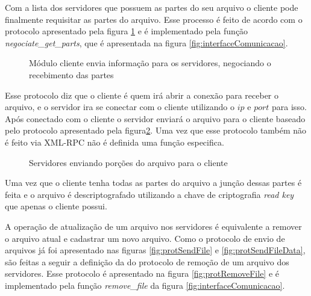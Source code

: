         Com a lista dos servidores que possuem as partes do seu arquivo o cliente pode finalmente requisitar as partes do arquivo. Esse processo é feito de acordo com o protocolo apresentado pela figura \ref{fig:protNegociateGetPart} e é implementado pela função \textit{negociate\_get\_parts}, que é apresentada na figura \ref{fig:interfaceComunicacao}.
        
                \begin{figure}[!ht]
        \caption{Módulo cliente envia informação para os servidores, negociando o recebimento das partes}
        \label{fig:protNegociateGetPart}
        \end{figure}
        
        Esse protocolo diz que o cliente é quem irá abrir a conexão para receber o arquivo, e o servidor ira se conectar com o cliente utilizando o $ip$ e $port$ para isso. Após conectado com o cliente o servidor enviará o arquivo para o cliente baseado pelo protocolo apresentado pela figura\ref{fig:protGetPart}. Uma vez que esse protocolo também não é feito via XML-RPC não é definida uma função especifica.
        
        \begin{figure}[!ht]
        \caption{Servidores enviando porções do arquivo para o cliente}
        \label{fig:protGetPart}
        \end{figure}
        
        
        
        Uma vez que o cliente tenha todas as partes do arquivo a junção dessas partes é feita e o arquivo é descriptografado utilizando a chave de criptografia \textit{read key} que apenas o cliente possui.
        
        A operação de atualização de um arquivo nos servidores é equivalente a remover o arquivo atual e cadastrar um novo arquivo. Como o protocolo de envio de arquivos já foi apresentado nas figuras \ref{fig:protSendFile} e \ref{fig:protSendFileData}, são feitas a seguir a definição da do protocolo de remoção de um arquivo dos servidores. Esse protocolo é apresentado na figura \ref{fig:protRemoveFile} e é implementado pela função \textit{remove\_file} da figura \ref{fig:interfaceComunicacao}.
        
